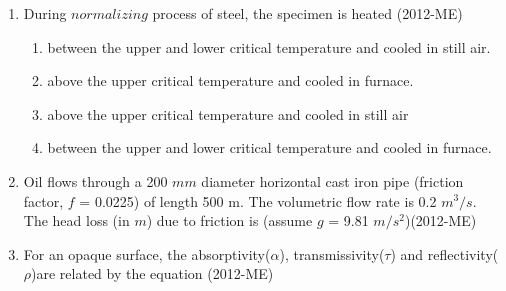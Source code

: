 \documentclass[journal,12pt,twocolumn]{IEEEtran}
\theoremstyle{remark}
\begin{document}
\begin{enumerate}
\begin{enumerate}
\begin{multicols}{4}
		     \end{multicols}                            
                         \end{enumerate}





\item During $normalizing$ process of steel, the specimen is heated \hfill{(2012-ME)}
\begin{enumerate}
\item  between the upper and lower critical temperature and cooled in still air.
\item  above the upper critical temperature and cooled in furnace.
\item  above the upper critical temperature and cooled in still air
\item  between the upper and lower critical temperature and cooled in furnace.
\end{enumerate}

\item Oil flows through a 200 $mm$ diameter horizontal cast iron pipe (friction factor, $f$ = 0.0225) of length 500 m. The volumetric flow rate is 0.2 $m^3/s$. The head loss (in $m$) due to friction is (assume $g$ = 9.81 $m/s^2$)\hfill{(2012-ME)}
\begin{enumerate}
\end{enumerate}


\item For an opaque surface, the absorptivity($\alpha$), transmissivity($\tau$) and reflectivity($\rho$)are related by the equation \hfill{(2012-ME)} 
                 \begin{enumerate}   
                         \end{enumerate}



\end{enumerate}
\end{document}
